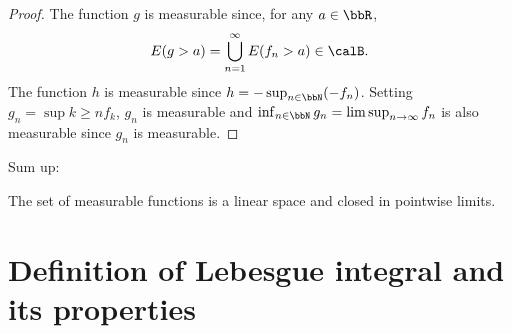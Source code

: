\documentclass[openany, a4paper, oneside]{jsbook}
\begin{document}
\begin{proof}
The function $g$ is measurable since, for any $a \in \bbR$,
\begin{align}
 E (g > a)
 =
 \bigcup_{n=1}^{\infty} E (f_n > a) \in \calB.
\end{align}
The function $h$ is measurable since $h = - \sup_{n \in \bbN} (- f_n)$.
Setting $g_n = \sup{k \geq n} f_k$, $g_n$ is measurable and
$\inf_{n \in \bbN} g_n = \limsup_{n \to \infty} f_n$ is also measurable
since $g_n$ is measurable.
\end{proof}
Sum up:
\begin{thm}
 The set of measurable functions is a linear space and closed in pointwise limits.
\end{thm}
\section{Definition of Lebesgue integral and its properties}
\end{document}
